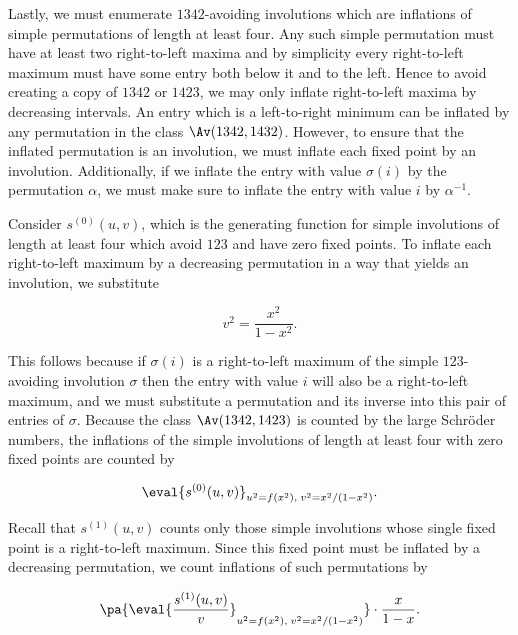 \documentclass[12pt,twoside]{memoir}
\begin{document}
      Lastly, we must enumerate $1342$-avoiding involutions which are inflations of
      simple permutations of length at least four. Any such simple permutation must
      have at least two right-to-left maxima and by simplicity every right-to-left
      maximum must have some entry both below it and to the left. Hence to avoid
      creating a copy of $1342$ or $1423$, we may only inflate right-to-left maxima
      by decreasing intervals. An entry which is a left-to-right minimum can be
      inflated by any permutation in the class $\Av(1342,1432)$. However, to ensure
      that the inflated permutation is an involution, we must inflate each fixed
      point by an involution. Additionally, if we inflate the entry with value
      $\sigma(i)$ by the permutation $\alpha$, we must make sure to inflate the
      entry with value $i$ by $\alpha^{-1}$.

      Consider $s^{(0)}(u,v)$, which is the generating function for
      simple involutions of length at least four which avoid $123$ and have zero
      fixed points. To inflate each right-to-left maximum by a decreasing
      permutation in a way that yields an involution, we substitute 
      
      $$ v^2 = \frac{x^2}{1-x^2} .$$

      This follows because if $\sigma(i)$ is a right-to-left maximum of the simple
      $123$-avoiding involution $\sigma$ then the entry with value $i$ will also be
      a right-to-left maximum, and we must substitute a permutation and its inverse
      into this pair of entries of $\sigma$. Because the class $\Av(1342,1423)$ is
      counted by the large Schr\"oder numbers, the inflations of the simple
      involutions of length at least four with zero fixed points are counted by

      \begin{equation}
        \label{involutions:eqn:1342-3}
        \eval{s^{(0)}(u,v)}_{u^2=f(x^2),\;v^2=x^2/(1-x^2)}.
      \end{equation}
        
      Recall that $s^{(1)}(u,v)$ counts only those simple involutions
      whose single fixed point is a right-to-left maximum. Since this fixed point
      must be inflated by a decreasing permutation, we count inflations of such
      permutations by 
      
      \begin{equation}
        \label{involutions:eqn:1342-4}
        \pa{\eval{\frac{s^{(1)}(u,v)}{v}}_{u^2=f(x^2),\;v^2=x^2/(1-x^2)}}
        \cdot\frac{x}{1-x}.
      \end{equation}
\end{document}
